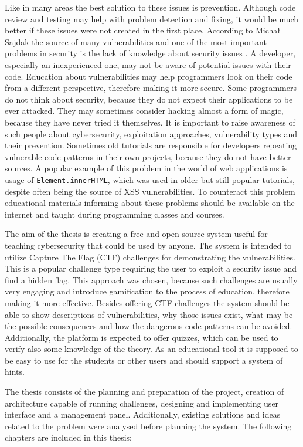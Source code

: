 Like in many areas the best solution to these issues is prevention. Although code review and testing may help with problem detection and fixing, it would be much better if these issues were not created in the first place. According to Michał Sajdak the source of many vulnerabilities and one of the most important problems in security is the lack of knowledge about security issues \cite{bib:securitum-wstep}. A developer, especially an inexperienced one, may not be aware of potential issues with their code. Education about vulnerabilities may help programmers look on their code from a different perspective, therefore making it more secure. Some programmers do not think about security, because they do not expect their applications to be ever attacked. They may sometimes consider hacking almost a form of magic, because they have never tried it themselves. It is important to raise awareness of such people about cybersecurity, exploitation approaches, vulnerability types and their prevention. Sometimes old tutorials are responsible for developers repeating vulnerable code patterns in their own projects, because they do not have better sources. A popular example of this problem in the world of web applications is usage of \texttt{Element.innerHTML}, which was used in older but still popular tutorials, despite often being the source of XSS vulnerabilities. To counteract this problem educational materials informing about these problems should be available on the internet and taught during programming classes and courses.

The aim of the thesis is creating a free and open-source system useful for teaching cybersecurity that could be used by anyone. The system is intended to utilize Capture The Flag (CTF) challenges for demonstrating the vulnerabilities. This is a popular challenge type requiring the user to exploit a security issue and find a hidden flag. This approach was chosen, because such challenges are usually very engaging and introduce gamification to the process of education, therefore making it more effective. Besides offering CTF challenges the system should be able to show descriptions of vulnerabilities, why those issues exist, what may be the possible consequences and how the dangerous code patterns can be avoided. Additionally, the platform is expected to offer quizzes, which can be used to verify also some knowledge of the theory. As an educational tool it is supposed to be easy to use for the students or other users and should support a system of hints.

The thesis consists of the planning and preparation of the project, creation of architecture capable of running challenges, designing and implementing user interface and a management panel. Additionally, existing solutions and ideas related to the problem were analysed before planning the system. The following chapters are included in this thesis:

